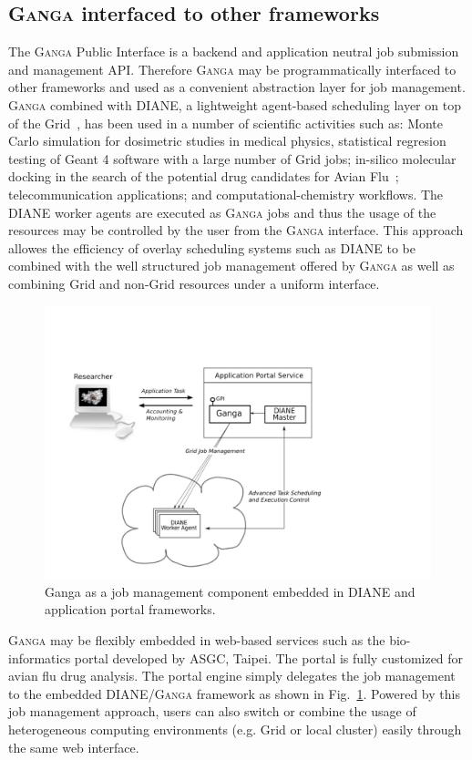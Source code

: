 \documentclass{elsart}
\def\ganga {\textsc{Ganga}\xspace}
\def\diane {\textsc{DIANE}\xspace}
\def\grid {Grid\xspace}
\begin{document}
\subsection{\ganga interfaced to other frameworks}
\label{sec:GangaInOtherFrameworks}
The \ganga Public Interface is a backend and application neutral job
submission and management API. Therefore \ganga may be programmatically
interfaced to other frameworks and used as a convenient abstraction layer for
job management. \ganga combined with \diane, a lightweight agent-based
scheduling layer on top of the \grid~\cite{DIANE}, has been used in a number
of scientific activities such as: Monte Carlo simulation for dosimetric
studies in medical physics, statistical regresion testing of Geant 4 \cite{Geant4}
software
with a large number of \grid jobs; in-silico molecular docking in the search
of the potential drug candidates for Avian Flu~\cite{AvianFlu};
telecommunication applications; and computational-chemistry workflows. The
\diane worker agents are executed as \ganga jobs and thus the usage of the
resources may be controlled by the user from the \ganga interface. This
approach allowes the efficiency of overlay scheduling systems such
as \diane to be combined with the well structured job management offered by \ganga as well as
combining \grid and non-\grid resources under a uniform interface.

\begin{figure}
  \centering
  \includegraphics[width=1 \textwidth]{ganga-diane-portal.pdf}
  \caption{Ganga as a job management component embedded in DIANE and
    application portal frameworks.}
  \label{fig:webportal}
\end{figure}
\ganga may be flexibly embedded in web-based services such as the
bio-informatics portal developed by ASGC, Taipei. The portal is fully
customized for avian flu drug analysis.  The portal engine simply delegates
the job management to the embedded \diane/\ganga framework as shown in
Fig.~\ref{fig:webportal}. Powered by this job management approach, users can
also switch or combine the usage of heterogeneous computing environments (e.g.
\grid or local cluster) easily through the same web interface.
\end{document}
